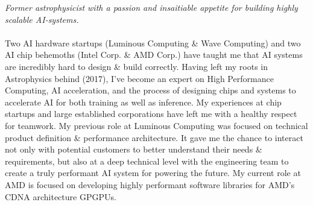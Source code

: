 \documentclass[10pt,a4paper]{article}
\begin{document}
\vspace{-1.3em}  %
\begin{multicols}{2}  %
\noindent \emph{Former astrophysicist with a passion and insaitiable appetite for building highly scalable AI-systems.}
\\
\\
Two AI hardware startups (Luminous Computing \& Wave Computing) and two AI chip behemoths (Intel Corp. \& AMD Corp.) have taught me that AI systems are incredibly hard to design \& build correctly. Having left my roots in Astrophysics behind (2017), I've become an expert on High Performance Computing, AI acceleration, and the process of designing chips and systems to accelerate AI for both training as well as inference. My experiences at chip startups and large established corporations have left me with a healthy respect for teamwork. My previous role at Luminous Computing was focused on technical product definition \& performance architecture. It gave me the chance to interact not only with potential customers to better understand their needs \& requirements, but also at a deep technical level with the engineering team to create a truly performant AI system for powering the future. My current role at AMD is focused on developing highly performant software libraries for AMD's CDNA architecture GPGPUs.





\end{multicols}
\end{document}
